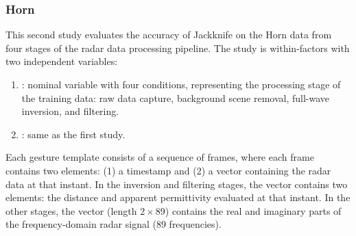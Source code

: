 \subsubsection{Horn} \label{sec:radar-experiments:sensors:protocol:horn}
This second study evaluates the accuracy of Jackknife on the Horn data from four stages of the radar data processing pipeline. The study is within-factors with two independent variables:
\begin{enumerate}
    \item {}: nominal variable with four conditions, representing the processing stage of the training data: raw data capture, background scene removal, full-wave inversion, and filtering.
    \item {}: same as the first study.
\end{enumerate}
Each gesture template consists of a sequence of frames, where each frame contains two elements: (1) a timestamp and (2) a vector containing the radar data at that instant. In the inversion and filtering stages, the vector contains two elements: the distance and apparent permittivity evaluated at that instant. In the other stages, the vector (length $2 \times 89$) contains the real and imaginary parts of the frequency-domain radar signal (89 frequencies). 


